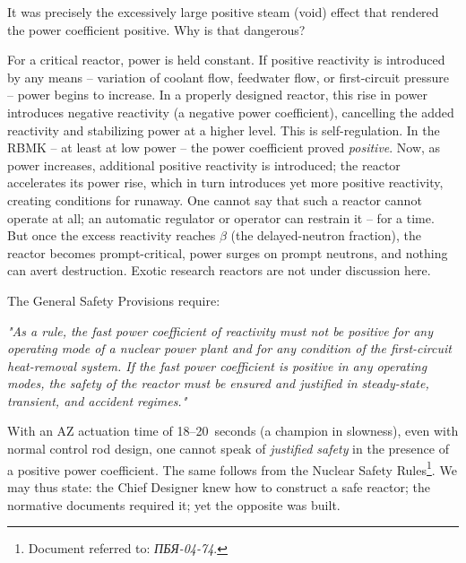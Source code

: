 \documentclass[openright]{bookest}
\begin{document}
It was precisely the excessively large positive steam (void) effect that rendered the power coefficient positive. Why is that dangerous?

For a critical reactor, power is held constant. If positive reactivity is introduced by any means -- variation of coolant flow, feedwater flow, or first-circuit pressure -- power begins to increase. In a properly designed reactor, this rise in power introduces negative reactivity (a negative power coefficient), cancelling the added reactivity and stabilizing power at a higher level. This is self-regulation. In the RBMK -- at least at low power -- the power coefficient proved \textit{positive}. Now, as power increases, additional positive reactivity is introduced; the reactor accelerates its power rise, which in turn introduces yet more positive reactivity, creating conditions for runaway. One cannot say that such a reactor cannot operate at all; an automatic regulator or operator can restrain it -- for a time. But once the excess reactivity reaches $\beta$ (the delayed-neutron fraction), the reactor becomes prompt-critical, power surges on prompt neutrons, and nothing can avert destruction. Exotic research reactors are not under discussion here.

The General Safety Provisions require:

\begin{personal}
\textit{"As a rule, the fast power coefficient of reactivity must not be positive for any operating mode of a nuclear power plant and for any condition of the first-circuit heat-removal system. If the fast power coefficient is positive in any operating modes, the safety of the reactor must be ensured and justified in steady-state, transient, and accident regimes."}
\end{personal}

With an AZ actuation time of \numrange{18}{20}~seconds (a champion in slowness), even with normal control rod design, one cannot speak of \textit{justified safety} in the presence of a positive power coefficient. The same follows from the Nuclear Safety Rules\footnote{Document referred to: \textit{ПБЯ-04-74}.}. We may thus state: the Chief Designer knew how to construct a safe reactor; the normative documents required it; yet the opposite was built.
\end{document}
